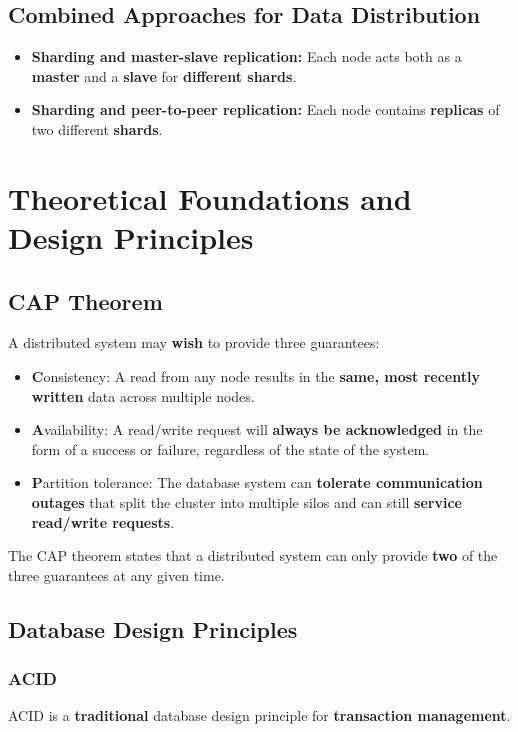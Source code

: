 \documentclass[12pt,a4paper]{report}
\begin{document}
\subsection{Combined Approaches for Data Distribution}
\begin{itemize}
  \item \textbf{Sharding and master-slave replication:} Each node acts both as a \textbf{master} and a \textbf{slave} for \textbf{different shards}.
  \item \textbf{Sharding and peer-to-peer replication:} Each node contains \textbf{replicas} of two different \textbf{shards}.
\end{itemize}

\section{Theoretical Foundations and Design Principles}

\subsection{CAP Theorem}
A distributed system may \textbf{wish} to provide three guarantees:
\begin{itemize}
  \item \textbf{C}onsistency: A read from any node results in the \textbf{same, most recently written} data across multiple nodes.
  \item \textbf{A}vailability: A read/write request will \textbf{always be acknowledged} in the form of a success or failure, regardless of the state of the system.
  \item \textbf{P}artition tolerance: The database system can \textbf{tolerate communication outages} that split the cluster into multiple silos and can still \textbf{service read/write requests}.
\end{itemize}

\begin{keyconcept}
The CAP theorem states that a distributed system can only provide \textbf{two} of the three guarantees at any given time.
\end{keyconcept}

\subsection{Database Design Principles}

\subsubsection{ACID}
ACID is a \textbf{traditional} database design principle for \textbf{transaction management}.
\end{document}
